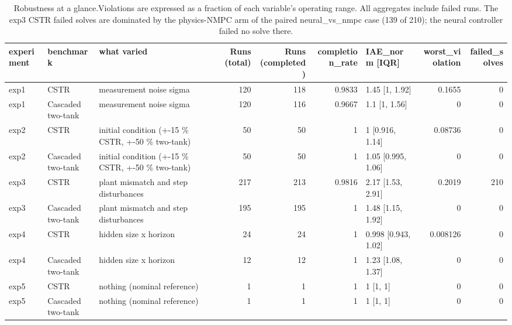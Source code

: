 \begin{table}
\caption{Robustness at a glance.Violations are expressed as a fraction of each variable's operating range. All aggregates include failed runs. The exp3 CSTR failed solves are dominated by the physics-NMPC arm of the paired neural\_vs\_nmpc case (139 of 210); the neural controller failed no solve there.}
\label{tab:T0_robustness_at_a_glance}
\begin{tabular}{lllrrrlrr}
\toprule
experiment & benchmark & what varied & Runs (total) & Runs (completed) & completion\_rate & IAE\_norm [IQR] & worst\_violation & failed\_solves \\
\midrule
exp1 & CSTR & measurement noise sigma & 120 & 118 & 0.9833 & 1.45 [1, 1.92] & 0.1655 & 0 \\
exp1 & Cascaded two-tank & measurement noise sigma & 120 & 116 & 0.9667 & 1.1 [1, 1.56] & 0 & 0 \\
exp2 & CSTR & initial condition (+-15 \% CSTR, +-50 \% two-tank) & 50 & 50 & 1 & 1 [0.916, 1.14] & 0.08736 & 0 \\
exp2 & Cascaded two-tank & initial condition (+-15 \% CSTR, +-50 \% two-tank) & 50 & 50 & 1 & 1.05 [0.995, 1.06] & 0 & 0 \\
exp3 & CSTR & plant mismatch and step disturbances & 217 & 213 & 0.9816 & 2.17 [1.53, 2.91] & 0.2019 & 210 \\
exp3 & Cascaded two-tank & plant mismatch and step disturbances & 195 & 195 & 1 & 1.48 [1.15, 1.92] & 0 & 0 \\
exp4 & CSTR & hidden size x horizon & 24 & 24 & 1 & 0.998 [0.943, 1.02] & 0.008126 & 0 \\
exp4 & Cascaded two-tank & hidden size x horizon & 12 & 12 & 1 & 1.23 [1.08, 1.37] & 0 & 0 \\
exp5 & CSTR & nothing (nominal reference) & 1 & 1 & 1 & 1 [1, 1] & 0 & 0 \\
exp5 & Cascaded two-tank & nothing (nominal reference) & 1 & 1 & 1 & 1 [1, 1] & 0 & 0 \\
\bottomrule
\end{tabular}
\end{table}
